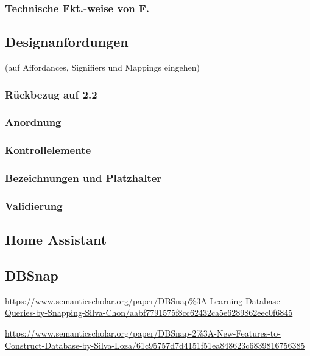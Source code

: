 \documentclass[a4paper, 12pt, oneside, BCOR=1cm,toc=chapterentrywithdots]{scrbook}
\begin{document}
\subsubsection{Technische Fkt.-weise von F.}
\subsection{Designanfordungen}
\cite{normanDesignEveryday2013} (auf Affordances, Signifiers und Mappings eingehen)
\subsubsection{Rückbezug auf 2.2}
\subsubsection{Anordnung}
\subsubsection{Kontrollelemente}
\subsubsection{Bezeichnungen und Platzhalter}
\subsubsection{Validierung}

\clearpage







\clearpage

\subsection{Home Assistant}
\subsection{DBSnap}
\parencite{silvaDBSnapLearning2015}
\url{https://www.semanticscholar.org/paper/DBSnap\%3A-Learning-Database-Queries-by-Snapping-Silva-Chon/aabf7791575f8cc62432ca5e6289862eec0f6845}

\url{https://www.semanticscholar.org/paper/DBSnap-2\%3A-New-Features-to-Construct-Database-by-Silva-Loza/61c95757d7d4151f51ea848623c6839816756385}
\end{document}
